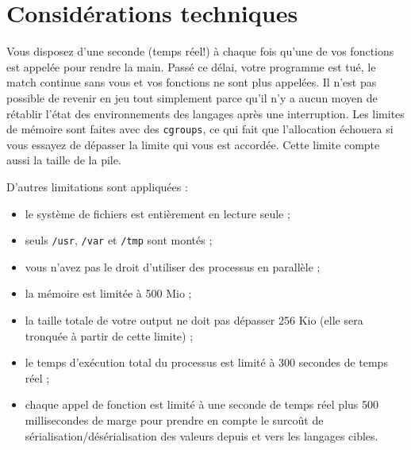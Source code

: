 \section{Considérations techniques}

Vous disposez d'une seconde (temps réel!) à chaque fois qu'une de vos fonctions
est appelée pour rendre la main. Passé ce délai, votre programme est tué, le
match continue sans vous et vos fonctions ne sont plus appelées. Il n'est pas
possible de revenir en jeu tout simplement parce qu'il n'y a aucun moyen de
rétablir l'état des environnements des langages après une interruption.  Les
limites de mémoire sont faites avec des \texttt{cgroups}, ce qui fait que
l'allocation échouera si vous essayez de dépasser la limite qui vous est
accordée. Cette limite compte aussi la taille de la pile.

D'autres limitations sont appliquées :

\begin{itemize}
    \item le système de fichiers est entièrement en lecture seule ;
    \item seuls \texttt{/usr}, \texttt{/var} et \texttt{/tmp} sont montés ;
    \item vous n'avez pas le droit d'utiliser des processus en parallèle ;
    \item la mémoire est limitée à 500 Mio ;
    \item la taille totale de votre output ne doit pas dépasser 256 Kio (elle
        sera tronquée à partir de cette limite) ;
    \item le temps d'exécution total du processus est limité à 300 secondes de
        temps réel ;
    \item chaque appel de fonction est limité à une seconde de temps réel plus
        500 millisecondes de marge pour prendre en compte le surcoût de
        sérialisation/désérialisation des valeurs depuis et vers les langages
        cibles.
\end{itemize}
